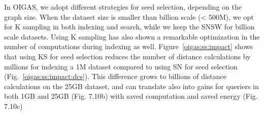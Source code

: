 In OIGAS, we adopt different strategies for seed selection, depending on the graph size. When the dataset size is smaller than billion scale (< 500M), we opt for K sampling in both indexing and search, while we keep the SNSW for billion scale datasets. Using K sampling has also shown a remarkable optimization in the number of computations during indexing as well. Figure~\ref{oigas:ss:impact} shows that using KS for seed selection reduces the number of distance calculations by millions for indexing a 1M dataset compared to using SN for seed selection (Fig.~\ref{oigas:ss:impact:dcs}). This difference grows to billions of distance calculations on the 25GB dataset, and can translate also into gains for queriers in both 1GB and 25GB (Fig. 7.10b) with saved computation and saved energy (Fig. 7.10c)
\begin{figure}[!htb]
\captionsetup{justification=centering}
	\centering


\end{figure}
